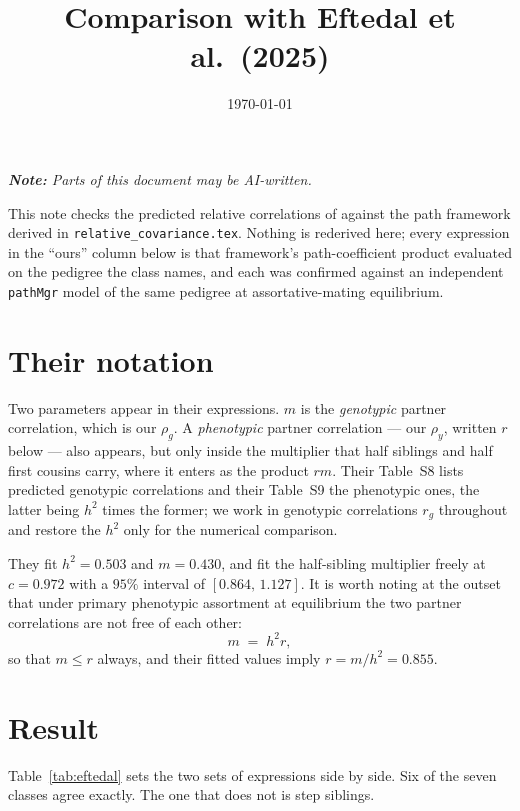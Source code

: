 \documentclass[12pt]{article}
\title{Comparison with Eftedal et al.\ (2025)}
\date{\today}
\begin{document}
\maketitle

\textit{\textbf{Note:} Parts of this document may be AI-written.}

This note checks the predicted relative correlations of \citet{Eftedal2025PNAS} against the path framework derived in \texttt{relative\_covariance.tex}.
Nothing is rederived here; every expression in the ``ours'' column below is that framework's path-coefficient product evaluated on the pedigree the class names, and each was confirmed against an independent \texttt{pathMgr} model of the same pedigree at assortative-mating equilibrium.

\section{Their notation}

Two parameters appear in their expressions.
$m$ is the \emph{genotypic} partner correlation, which is our $\rho_g$.
A \emph{phenotypic} partner correlation --- our $\rho_y$, written $r$ below --- also appears, but only inside the multiplier that half siblings and half first cousins carry, where it enters as the product $rm$.
Their Table~S8 lists predicted genotypic correlations and their Table~S9 the phenotypic ones, the latter being $h^2$ times the former; we work in genotypic correlations $r_g$ throughout and restore the $h^2$ only for the numerical comparison.

They fit $h^2 = 0.503$ and $m = 0.430$, and fit the half-sibling multiplier freely at $c = 0.972$ with a $95\%$ interval of $[0.864,\, 1.127]$.
It is worth noting at the outset that under primary phenotypic assortment at equilibrium the two partner correlations are not free of each other:
\begin{equation}\label{eq:mr}
    m \;=\; h^2 r ,
\end{equation}
so that $m \leq r$ always, and their fitted values imply $r = m/h^2 = 0.855$.

\section{Result}

Table~\ref{tab:eftedal} sets the two sets of expressions side by side.
Six of the seven classes agree exactly.
The one that does not is step siblings.
\end{document}

